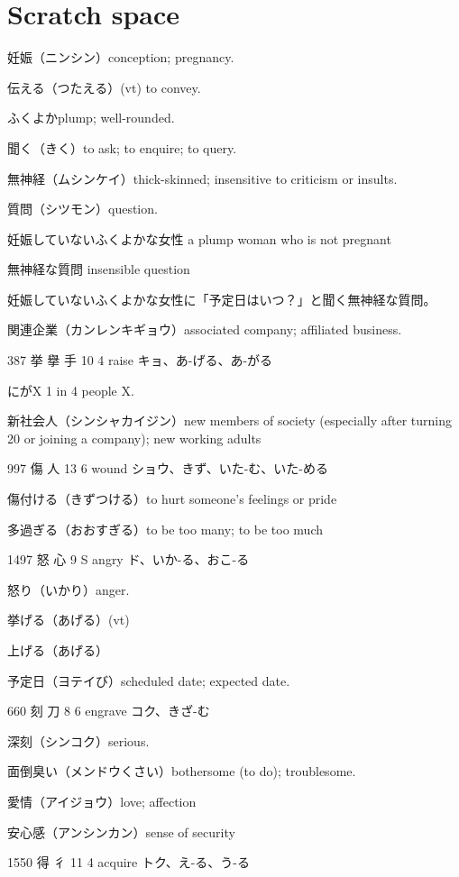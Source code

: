 \chapter{Scratch space}

妊娠（ニンシン）conception; pregnancy.

伝える（つたえる）(vt) to convey.

ふくよかplump; well-rounded.

聞く（きく）to ask; to enquire; to query.

無神経（ムシンケイ）thick-skinned; insensitive to criticism or insults.

質問（シツモン）question.

妊娠していないふくよかな女性
a plump woman who is not pregnant

無神経な質問
insensible question

妊娠していないふくよかな女性に「予定日はいつ？」と聞く無神経な質問。

関連企業（カンレンキギョウ）associated company; affiliated business.

387	挙	擧	手	10	4		raise	キョ、あ-げる、あ-がる

にがX 1 in 4 people X.

新社会人（シンシャカイジン）new members of society (especially after turning 20 or joining a company); new working adults

997	傷		人	13	6		wound	ショウ、きず、いた-む、いた-める

傷付ける（きずつける）to hurt someone's feelings or pride

多過ぎる（おおすぎる）to be too many; to be too much

1497	怒		心	9	S		angry	ド、いか-る、おこ-る

怒り（いかり）anger.

挙げる（あげる）(vt)

上げる（あげる）

予定日（ヨテイび）scheduled date; expected date.

660	刻		刀	8	6		engrave	コク、きざ-む

深刻（シンコク）serious.

面倒臭い（メンドウくさい）bothersome (to do); troublesome.

愛情（アイジョウ）love; affection

安心感（アンシンカン）sense of security

1550	得		彳	11	4		acquire	トク、え-る、う-る

